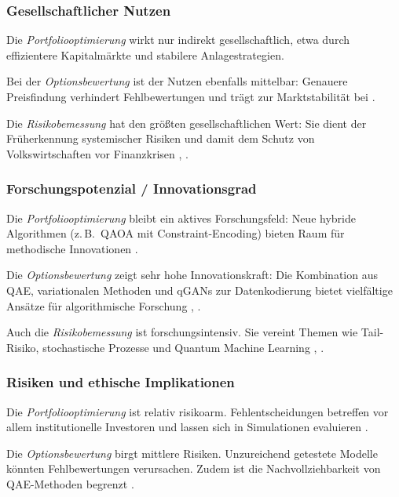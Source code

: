 \subsubsection*{Gesellschaftlicher Nutzen}

Die \textit{Portfoliooptimierung} wirkt nur indirekt gesellschaftlich, etwa durch effizientere Kapitalmärkte und stabilere Anlagestrategien.

Bei der \textit{Optionsbewertung} ist der Nutzen ebenfalls mittelbar: Genauere Preisfindung verhindert Fehlbewertungen und trägt zur Marktstabilität bei \cite[S.~3]{stamatopoulos_option_2020}.

Die \textit{Risikobemessung} hat den größten gesellschaftlichen Wert: Sie dient der Früherkennung systemischer Risiken und damit dem Schutz von Volkswirtschaften vor Finanzkrisen \cite[S.~6]{orus_quantum_2019}, \cite[S.~4]{zoufal_quantum_2019}.

\subsubsection*{Forschungspotenzial / Innovationsgrad}

Die \textit{Portfoliooptimierung} bleibt ein aktives Forschungsfeld: Neue hybride Algorithmen (z.\,B.\ QAOA mit Constraint-Encoding) bieten Raum für methodische Innovationen \cite[S.~4]{buonaiuto_best_2023}.

Die \textit{Optionsbewertung} zeigt sehr hohe Innovationskraft: Die Kombination aus QAE, variationalen Methoden und qGANs zur Datenkodierung bietet vielfältige Ansätze für algorithmische Forschung \cite[S.~2–3]{zoufal_quantum_2019}, \cite[S.~5]{stamatopoulos_option_2020}.

Auch die \textit{Risikobemessung} ist forschungsintensiv. Sie vereint Themen wie Tail-Risiko, stochastische Prozesse und Quantum Machine Learning \cite[S.~3]{egger2020}, \cite[S.~5]{martin2022}.

\subsubsection*{Risiken und ethische Implikationen}

Die \textit{Portfoliooptimierung} ist relativ risikoarm. Fehlentscheidungen betreffen vor allem institutionelle Investoren und lassen sich in Simulationen evaluieren \cite[S.~3]{sakuler_real-world_2025}.

Die \textit{Optionsbewertung} birgt mittlere Risiken. Unzureichend getestete Modelle könnten Fehlbewertungen verursachen. Zudem ist die Nachvollziehbarkeit von QAE-Methoden begrenzt \cite[S.~6]{stamatopoulos_option_2020}.

